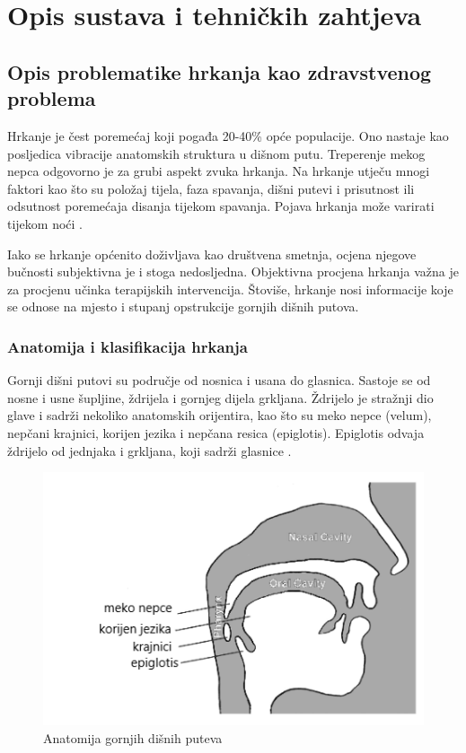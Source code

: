 \chapter{Opis sustava i tehničkih zahtjeva}

\section{Opis problematike hrkanja kao zdravstvenog problema}

Hrkanje je čest poremećaj koji pogađa 20-40\% opće populacije. Ono nastaje kao posljedica vibracije anatomskih struktura u dišnom putu. Treperenje mekog nepca odgovorno je za grubi aspekt zvuka hrkanja. Na hrkanje utječu mnogi faktori kao što su položaj tijela, faza spavanja, dišni putevi i prisutnost ili odsutnost poremećaja disanja tijekom spavanja. Pojava hrkanja može varirati tijekom noći \cite{pevernagie}. 

Iako se hrkanje općenito doživljava kao društvena smetnja, ocjena njegove bučnosti subjektivna je i stoga nedosljedna. Objektivna procjena hrkanja važna je za procjenu učinka terapijskih intervencija. Štoviše, hrkanje nosi informacije koje se odnose na mjesto i stupanj opstrukcije gornjih dišnih putova.

\subsection{Anatomija i klasifikacija hrkanja}
Gornji dišni putovi su područje od nosnica i usana do glasnica. Sastoje se od nosne i usne šupljine, ždrijela i gornjeg dijela grkljana. Ždrijelo je stražnji dio glave i sadrži nekoliko anatomskih orijentira, kao što su meko nepce (velum), nepčani krajnici, korijen jezika i nepčana resica (epiglotis). Epiglotis odvaja ždrijelo od jednjaka i grkljana, koji sadrži glasnice \cite{snoringml}.

\begin{figure}[ht]
	\includegraphics[width=\linewidth]{imgs/anatomy}
	\caption{Anatomija gornjih dišnih puteva \cite{snoringml}}
	\label{fig:anatomy}
\end{figure}

